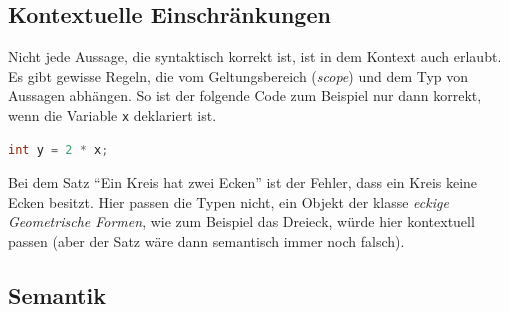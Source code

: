 \documentclass[ngerman]{scrartcl}
\begin{document}
\subsection{Kontextuelle Einschränkungen}

Nicht jede Aussage, die syntaktisch korrekt ist, ist in dem Kontext auch erlaubt. Es gibt gewisse Regeln, die vom Geltungsbereich (\emph{scope}) und dem Typ von Aussagen abhängen. So ist der folgende Code zum Beispiel nur dann korrekt, wenn die Variable \verb|x| deklariert ist.
\begin{lstlisting}[language=C]
int y = 2 * x;
\end{lstlisting}
Bei dem Satz \enquote{Ein Kreis hat zwei Ecken} ist der Fehler, dass ein Kreis keine Ecken besitzt. Hier passen die Typen nicht, ein Objekt der klasse \emph{eckige Geometrische Formen}, wie zum Beispiel das Dreieck, würde hier kontextuell passen (aber der Satz wäre dann semantisch immer noch falsch).

\subsection{Semantik}
\end{document}
